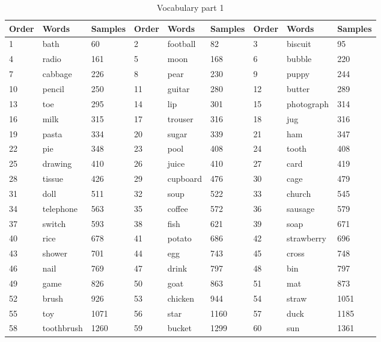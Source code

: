 \documentclass[12pt,a4paper]{report}
\begin{document}
\begin{table}[]
\centering
\caption{Vocabulary part 1}
\label{Vocabulary part 1}
\begin{tabular}{lllllllll}
Order&Words & Samples&Order&Words & Samples&Order&Words & Samples\\
\hline

1  & bath       & 60   & 2  & football   & 82   & 3  & biscuit    & 95   \\
4  & radio      & 161  & 5  & moon       & 168  & 6  & bubble     & 220  \\
7  & cabbage    & 226  & 8  & pear       & 230  & 9  & puppy      & 244  \\
10 & pencil     & 250  & 11 & guitar     & 280  & 12 & butter     & 289  \\
13 & toe        & 295  & 14 & lip        & 301  & 15 & photograph & 314  \\
16 & milk       & 315  & 17 & trouser    & 316  & 18 & jug        & 316  \\
19 & pasta      & 334  & 20 & sugar      & 339  & 21 & ham        & 347  \\
22 & pie        & 348  & 23 & pool       & 408  & 24 & tooth      & 408  \\
25 & drawing    & 410  & 26 & juice      & 410  & 27 & card       & 419  \\
28 & tissue     & 426  & 29 & cupboard   & 476  & 30 & cage       & 479  \\
31 & doll       & 511  & 32 & soup       & 522  & 33 & church     & 545  \\
34 & telephone  & 563  & 35 & coffee     & 572  & 36 & sausage    & 579  \\
37 & switch     & 593  & 38 & fish       & 621  & 39 & soap       & 671  \\
40 & rice       & 678  & 41 & potato     & 686  & 42 & strawberry & 696  \\
43 & shower     & 701  & 44 & egg        & 743  & 45 & cross      & 748  \\
46 & nail       & 769  & 47 & drink      & 797  & 48 & bin        & 797  \\
49 & game       & 826  & 50 & goat       & 863  & 51 & mat        & 873  \\
52 & brush      & 926  & 53 & chicken    & 944  & 54 & straw      & 1051 \\
55 & toy        & 1071 & 56 & star       & 1160 & 57 & duck       & 1185 \\
58 & toothbrush & 1260 & 59 & bucket     & 1299 & 60 & sun        & 1361 \\

\end{tabular}
\end{table}
\end{document}
